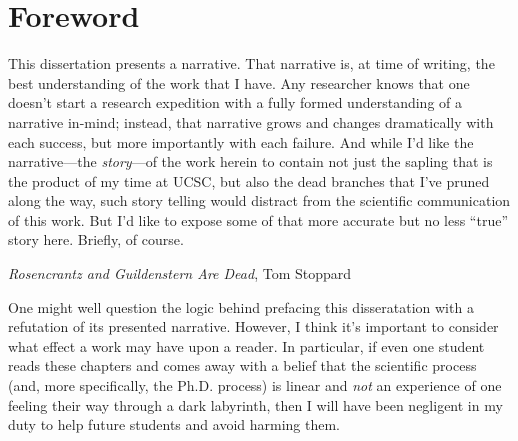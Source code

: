 
\begingroup
\let\clearpage\relax
\let\cleardoublepage\relax
\let\cleardoublepage\relax
\chapter*{Foreword}



This dissertation presents a narrative. That narrative is, at time of writing, the best understanding of the work that I
have. Any researcher knows that one doesn't start a research expedition with a fully formed understanding of a narrative
in-mind; instead, that narrative grows and changes dramatically with each success, but more importantly with each
failure. And while I'd like the narrative---the \emph{story}---of the work herein to contain not just the sapling that is the
product of my time at UCSC, but also the dead branches that I've pruned along the way, such story telling would distract
from the scientific communication of this work. But I'd like to expose some of that more accurate but no less ``true''
story here. Briefly, of course.

{\emph{Rosencrantz and Guildenstern Are Dead}, Tom Stoppard}

One might well question the logic behind prefacing this disseratation with a refutation of its presented narrative.
However, I think it's important to consider what effect a work may have upon a reader. In particular, if even one
student reads these chapters and comes away with a belief that the scientific process (and, more specifically, the Ph.D.
process) is linear and \emph{not} an experience of one feeling their way through a dark labyrinth, then I will have been
negligent in my duty to help future students and avoid harming them.


